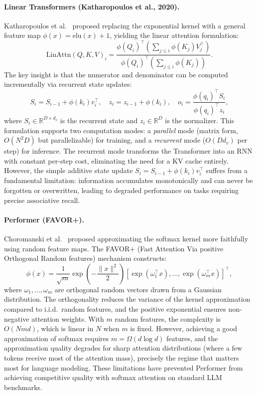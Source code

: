 \paragraph{Linear Transformers (Katharopoulos et al., 2020).}
Katharopoulos et al.~\cite{katharopoulos2020transformers} proposed replacing the exponential kernel with a general feature map $\phi(x) = \text{elu}(x) + 1$, yielding the linear attention formulation:
\begin{equation}
\text{LinAttn}(Q, K, V)_i = \frac{\phi(Q_i)^\top \left(\sum_{j \leq i} \phi(K_j) V_j^\top\right)}{\phi(Q_i)^\top \left(\sum_{j \leq i} \phi(K_j)\right)}.
\label{eq:linear-attn}
\end{equation}
The key insight is that the numerator and denominator can be computed incrementally via recurrent state updates:
\begin{equation}
S_i = S_{i-1} + \phi(k_i) v_i^\top, \quad z_i = z_{i-1} + \phi(k_i), \quad o_i = \frac{\phi(q_i)^\top S_i}{\phi(q_i)^\top z_i},
\label{eq:linear-attn-recurrent}
\end{equation}
where $S_i \in \mathbb{R}^{D \times d_v}$ is the recurrent state and $z_i \in \mathbb{R}^D$ is the normalizer. This formulation supports two computation modes: a \emph{parallel} mode (matrix form, $O(N^2 D)$ but parallelizable) for training, and a \emph{recurrent} mode ($O(D d_v)$ per step) for inference. The recurrent mode transforms the Transformer into an RNN with constant per-step cost, eliminating the need for a KV cache entirely. However, the simple additive state update $S_i = S_{i-1} + \phi(k_i) v_i^\top$ suffers from a fundamental limitation: information accumulates monotonically and can never be forgotten or overwritten, leading to degraded performance on tasks requiring precise associative recall.

\paragraph{Performer (FAVOR+).}
Choromanski et al.~\cite{choromanski2021rethinking} proposed approximating the softmax kernel more faithfully using random feature maps. The FAVOR+ (Fast Attention Via positive Orthogonal Random features) mechanism constructs:
\begin{equation}
\phi(x) = \frac{1}{\sqrt{m}} \exp\!\left(-\frac{\|x\|^2}{2}\right) \left[\exp(\omega_1^\top x), \ldots, \exp(\omega_m^\top x)\right]^\top,
\label{eq:favor}
\end{equation}
where $\omega_1, \ldots, \omega_m$ are orthogonal random vectors drawn from a Gaussian distribution. The orthogonality reduces the variance of the kernel approximation compared to i.i.d.\ random features, and the positive exponential ensures non-negative attention weights. With $m$ random features, the complexity is $O(Nmd)$, which is linear in $N$ when $m$ is fixed. However, achieving a good approximation of softmax requires $m = \Omega(d \log d)$ features, and the approximation quality degrades for sharp attention distributions (where a few tokens receive most of the attention mass), precisely the regime that matters most for language modeling. These limitations have prevented Performer from achieving competitive quality with softmax attention on standard LLM benchmarks.

